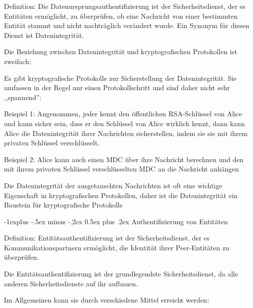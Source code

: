 \documentclass[a4paper]{article}
\makeatletter
\renewcommand{\subsection}{\@startsection{subsection}{2}{0mm}%
 {-1explus -.5ex minus -.2ex}%
 {0.5ex plus .2ex}%
 {\normalfont\normalsize\bfseries}}
\makeatother
\begin{document}
\begin{multicols}{3}
      Definition: Die Datenursprungsauthentifizierung ist der
      Sicherheitsdienst, der es Entitäten ermöglicht, zu überprüfen, ob eine
      Nachricht von einer bestimmten Entität stammt und nicht nachträglich
      verändert wurde. Ein Synonym für diesen Dienst ist Datenintegrität.

      \begin{itemize*}
            \item
            Die Beziehung zwischen Datenintegrität und kryptografischen
            Protokollen ist zweifach:

            \begin{itemize*}
                  \item Es gibt kryptografische Protokolle zur Sicherstellung der Datenintegrität. Sie umfassen in der Regel nur einen Protokollschritt und sind daher nicht sehr ,,spannend'':
                  \begin{itemize*} \item Beispiel 1: Angenommen, jeder kennt den öffentlichen RSA-Schlüssel von Alice und kann sicher sein, dass er den Schlüssel von Alice wirklich kennt, dann kann Alice die Datenintegrität ihrer Nachrichten sicherstellen, indem sie sie mit ihrem privaten Schlüssel verschlüsselt. \item Beispiel 2: Alice kann auch einen MDC über ihre Nachricht berechnen und den mit ihrem privaten Schlüssel verschlüsselten MDC an die Nachricht anhängen \end{itemize*}
                  \item Die Datenintegrität der ausgetauschten Nachrichten ist oft eine wichtige Eigenschaft in kryptografischen Protokollen, daher ist die Datenintegrität ein Baustein für kryptografische Protokolle
            \end{itemize*}
      \end{itemize*}


      \subsection{Authentifizierung von
            Entitäten}

      Definition: Entitätsauthentifizierung ist der Sicherheitsdienst, der es
      Kommunikationspartnern ermöglicht, die Identität ihrer Peer-Entitäten zu
      überprüfen.

      \begin{itemize*}
            \item
            Die Entitätsauthentifizierung ist der grundlegendste
            Sicherheitsdienst, da alle anderen Sicherheitsdienste auf ihr
            aufbauen.
            \item
            Im Allgemeinen kann sie durch verschiedene Mittel erreicht werden:


\end{itemize*}
\end{multicols}
\end{document}
